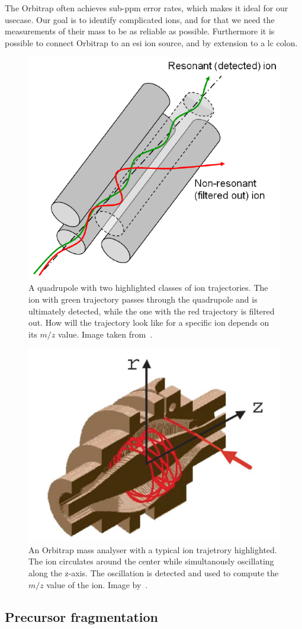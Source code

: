 \begin{description}
    The Orbitrap often achieves sub-ppm error rates, which makes it ideal for our usecase. Our goal is to identify complicated ions, and for that we need the measurements of their mass to be as reliable as possible. Furthermore it is possible to connect Orbitrap to an \gls*{esi} ion source, and by extension to a \gls*{lc} colon.
\end{description}

\begin{figure}
  \centering
  \includegraphics[width=.4\linewidth]{img/quadrupole.png}
  \caption{A quadrupole with two highlighted classes of ion trajectories. The ion with green trajectory passes through the quadrupole and is ultimately detected, while the one with the red trajectory is filtered out. How will the trajectory look like for a specific ion depends on its \(m/z\) value. Image taken from~\citet{2021Mass}.}\label{fig:quadrupole}
\end{figure}

\begin{figure}
  \centering
  \includegraphics[width=.5\linewidth]{img/orbitrap.png}
  \caption{An Orbitrap mass analyser with a typical ion trajetrory highlighted. The ion circulates around the center while simultanously oscillating along the z-axis. The oscillation is detected and used to compute the \(m/z\) value of the ion. Image by~\citet{hu2005orbitrap}.}\label{fig:orbitrap}
\end{figure}

\subsection{Precursor fragmentation}\label{sec:fragmentation}

